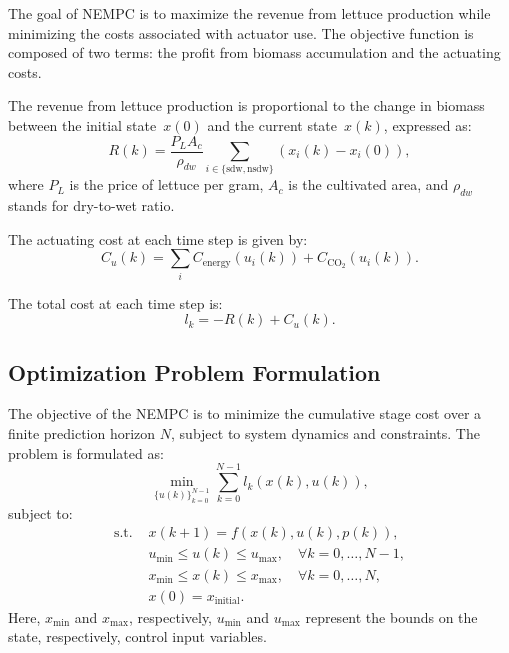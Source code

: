 \documentclass[conference]{IEEEtran}
\newcommand{\coo}{\ensuremath{\mathrm{CO_2}}}
\begin{document}
The goal of NEMPC is to maximize the revenue from lettuce production while minimizing the costs associated with actuator use. The objective function is composed of two terms: the profit from biomass accumulation and the actuating costs.

The revenue from lettuce production is proportional to the change in biomass between the initial state~\(x(0)\) and the current state~\(x(k)\), expressed as:
\begin{equation}
    R(k) = \frac{P_L A_c}{\rho_{dw}} \textstyle\sum_{i\in \{ \text{sdw}, \text{nsdw} \}}(x_i(k) - x_i(0)),
\end{equation}
where \(P_L\) is the price of lettuce per gram, \(A_c\) is the cultivated area, and \(\rho_{dw}\) stands for dry-to-wet ratio.

The actuating cost at each time step is given by:
\begin{equation}
    C_u(k) = \textstyle\sum_{i} C_{\text{energy}}(u_i(k)) + C_{\coo}(u_i(k)).
\end{equation}

The total cost at each time step is:
\begin{equation}
    l_k = -R(k) + C_u(k).
\end{equation}

\subsection{Optimization Problem Formulation}

The objective of the NEMPC is to minimize the cumulative stage cost over a finite prediction horizon \(N\), subject to system dynamics and constraints. The problem is formulated as:
\begin{equation}
    \min_{{\{u(k)\}}_{k=0}^{N-1}} \sum_{k=0}^{N-1} l_k(x(k), u(k)),
\end{equation}
subject to:
\begin{align}
    \text{s.t. } & x(k+1) = f(x(k), u(k), p(k)),                                      \\
                 & u_{\min} \leq u(k) \leq u_{\max}, \quad \forall k = 0, \dots, N-1, \\
                 & x_{\min} \leq x(k) \leq x_{\max}, \quad \forall k = 0, \dots, N,   \\
                 & x(0) = x_{\text{initial}}.
\end{align}
Here, \(x_{\min}\) and \(x_{\max}\), respectively, \(u_{\min}\) and \(u_{\max}\) represent the bounds on the state, respectively, control input variables.
\end{document}
